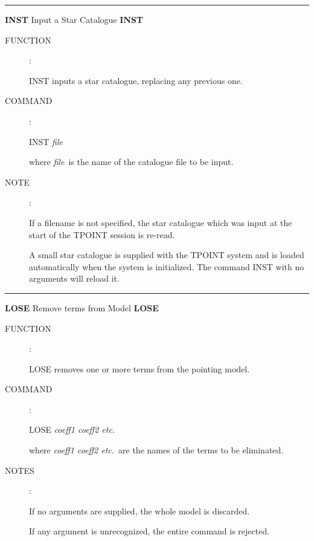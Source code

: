 
\goodbreak
\rule{\textwidth}{0.3mm}
{\Large {\bf INST} \hfill Input a Star Catalogue \hfill {\bf INST}}
\begin{description}
\item [FUNCTION]:

INST inputs a star catalogue, replacing any previous one.

\item [COMMAND]:

\begin{cmd}
\> \> INST {\it file}
\end{cmd}

where {\it file}\, is the name of the catalogue file to
be input.

\item [NOTE]:

If a filename is not specified, the star catalogue which was input
at the start of the TPOINT session is re-read.

A small star catalogue is supplied with the TPOINT
system and is loaded automatically when the system is initialized.
The command \mbox{INST} with no arguments will reload it.

\end{description}


\goodbreak
\rule{\textwidth}{0.3mm}
{\Large {\bf LOSE} \hfill Remove terms from Model \hfill {\bf LOSE}}
\begin{description}
\item [FUNCTION]:

LOSE removes one or more terms from the
pointing model.

\item [COMMAND]:

\begin{cmd}
\> \> LOSE {\it coeff1 coeff2 etc.}
\end{cmd}

where {\it coeff1 coeff2 etc.}\ are the names of the terms
to be eliminated.

\item [NOTES]:

If no arguments are supplied, the whole model is discarded.

If any argument is unrecognized, the entire command is rejected.

\end{description}

